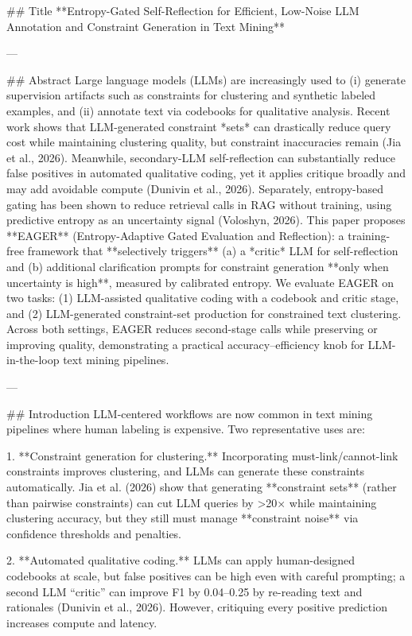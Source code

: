## Title
**Entropy-Gated Self-Reflection for Efficient, Low-Noise LLM Annotation and Constraint Generation in Text Mining**

---

## Abstract
Large language models (LLMs) are increasingly used to (i) generate supervision artifacts such as constraints for clustering and synthetic labeled examples, and (ii) annotate text via codebooks for qualitative analysis. Recent work shows that LLM-generated constraint *sets* can drastically reduce query cost while maintaining clustering quality, but constraint inaccuracies remain (Jia et al., 2026). Meanwhile, secondary-LLM self-reflection can substantially reduce false positives in automated qualitative coding, yet it applies critique broadly and may add avoidable compute (Dunivin et al., 2026). Separately, entropy-based gating has been shown to reduce retrieval calls in RAG without training, using predictive entropy as an uncertainty signal (Voloshyn, 2026).  
This paper proposes **EAGER** (Entropy-Adaptive Gated Evaluation and Reflection): a training-free framework that **selectively triggers** (a) a *critic* LLM for self-reflection and (b) additional clarification prompts for constraint generation **only when uncertainty is high**, measured by calibrated entropy. We evaluate EAGER on two tasks: (1) LLM-assisted qualitative coding with a codebook and critic stage, and (2) LLM-generated constraint-set production for constrained text clustering. Across both settings, EAGER reduces second-stage calls while preserving or improving quality, demonstrating a practical accuracy–efficiency knob for LLM-in-the-loop text mining pipelines.

---

## Introduction
LLM-centered workflows are now common in text mining pipelines where human labeling is expensive. Two representative uses are:

1. **Constraint generation for clustering.** Incorporating must-link/cannot-link constraints improves clustering, and LLMs can generate these constraints automatically. Jia et al. (2026) show that generating **constraint sets** (rather than pairwise constraints) can cut LLM queries by >20× while maintaining clustering accuracy, but they still must manage **constraint noise** via confidence thresholds and penalties.

2. **Automated qualitative coding.** LLMs can apply human-designed codebooks at scale, but false positives can be high even with careful prompting; a second LLM “critic” can improve F1 by 0.04–0.25 by re-reading text and rationales (Dunivin et al., 2026). However, critiquing every positive prediction increases compute and latency.

